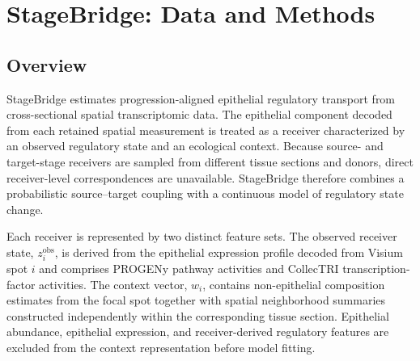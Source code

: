\chapter{StageBridge: Data and Methods}
\label{chap:methods}

\section{Overview}
\label{sec:methods-overview}

StageBridge estimates progression-aligned epithelial regulatory transport from
cross-sectional spatial transcriptomic data. The epithelial component decoded
from each retained spatial measurement is treated as a receiver characterized
by an observed regulatory state and an ecological context. Because source- and target-stage receivers are sampled from different tissue
sections and donors, direct receiver-level correspondences are unavailable. StageBridge therefore combines a probabilistic source--target coupling with a continuous model of regulatory state change.

Each receiver is represented by two distinct feature sets. The observed
receiver state, \(z_i^{\mathrm{obs}}\), is derived from the epithelial
expression profile decoded from Visium spot \(i\) and comprises PROGENy pathway
activities and CollecTRI transcription-factor activities. The context vector,
\(w_i\), contains non-epithelial composition estimates from the focal spot
together with spatial neighborhood summaries constructed independently within
the corresponding tissue section. Epithelial abundance, epithelial expression,
and receiver-derived regulatory features are excluded from the context
representation before model fitting.

